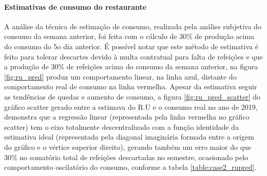     \paragraph{Estimativas de consumo do restaurante}
        A análise da técnica de estimação de consumo, realizada pela análise subjetiva do consumo da semana anterior, foi feita com o cálculo de 30\% de produção acima do consumo do 5o dia anterior. É possível notar que este método de estimativa é feito para tolerar descartes devido à multa contratual para falta de refeições e que a produção de 30\% de refeições acima do consumo da semana anterior, na figura  \ref{fig:ru_pred} produz um comportamento linear, na linha azul, distante do comportamento real de consumo na linha vermelha. Apesar da estimativa seguir as tendências de quedas e aumento de consumo, a figura \ref{fig:ru_pred_scatter} do gráfico scatter gerado entre a estimava do R.U e o consumo real no ano de 2019, demonstra que a regressão linear (representada pela linha vermelha no gráfico scatter) tem o eixo totalmente descentralizado com a função identidade da estimativa ideal (representada pela diagonal imaginária formada entre a origem do gráfico e o vértice superior direito), gerando também um erro maior do que 30\% no somatório total de refeições descartadas no semestre, ocasionado pelo comportamento oscilatório do consumo, conforme a tabela \ref{table:case2_rupred}.
